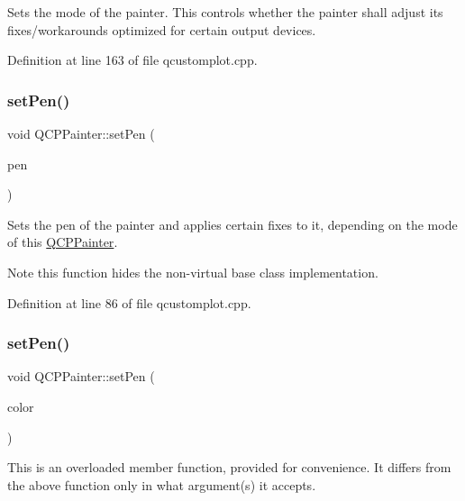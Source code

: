 Sets the mode of the painter. This controls whether the painter shall adjust its fixes/workarounds optimized for certain output devices. 

Definition at line 163 of file qcustomplot.\+cpp.

\mbox{\label{class_q_c_p_painter_af9c7a4cd1791403901f8c5b82a150195}} 
\subsubsection{\texorpdfstring{set\+Pen()}{setPen()}\hspace{0.1cm}{\footnotesize\ttfamily [1/3]}}
{\footnotesize\ttfamily void Q\+C\+P\+Painter\+::set\+Pen (\begin{DoxyParamCaption}\item[{const Q\+Pen \&}]{pen }\end{DoxyParamCaption})}

Sets the pen of the painter and applies certain fixes to it, depending on the mode of this \hyperlink{class_q_c_p_painter}{Q\+C\+P\+Painter}.

\begin{DoxyNote}{Note}
this function hides the non-\/virtual base class implementation. 
\end{DoxyNote}


Definition at line 86 of file qcustomplot.\+cpp.

\mbox{\label{class_q_c_p_painter_a5c4d88f21564e156e88ef807f7cf0003}} 
\subsubsection{\texorpdfstring{set\+Pen()}{setPen()}\hspace{0.1cm}{\footnotesize\ttfamily [2/3]}}
{\footnotesize\ttfamily void Q\+C\+P\+Painter\+::set\+Pen (\begin{DoxyParamCaption}\item[{const Q\+Color \&}]{color }\end{DoxyParamCaption})}

This is an overloaded member function, provided for convenience. It differs from the above function only in what argument(s) it accepts.

